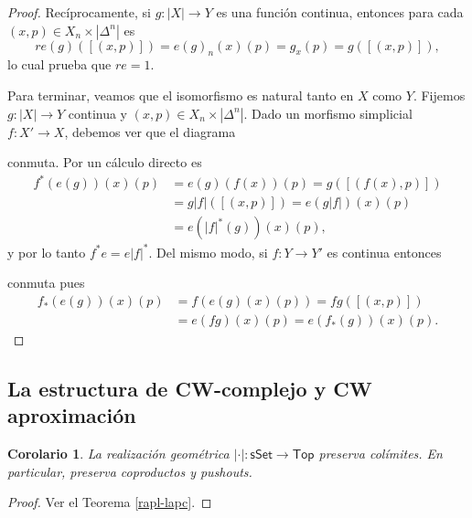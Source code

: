 \documentclass[11pt]{report}
\theoremstyle{colored}
\newtheorem{corollary}{Corolario}[section]
\newcommand{\cat}[1]{\mathsf{#1}}
\renewcommand{\ss}[1]{\Delta^{#1}}
\begin{document}
\begin{proof}
Recíprocamente, si $g : |X| \to Y$ es una función continua, entonces para cada $(x,p) \in X_n \times |\ss{n}|$ es
\[
r e(g)([(x,p)]) = e(g)_n(x)(p) = g_x(p) = g([(x,p)]),
\]
lo cual prueba que $r e  = 1$.

Para terminar, veamos que el isomorfismo es natural tanto en $X$ como $Y$. Fijemos $g : |X| \to Y$ continua y $(x,p) \in X_n \times |\ss{n}|$. Dado un morfismo simplicial $f : X' \to X$, debemos ver que el diagrama
\begin{center}
\end{center}
conmuta. Por un cálculo directo es
\begin{align*}
f^*(e(g))(x)(p) &= e(g)(f(x))(p) = g([(f(x),p)])\\
& = g|f|([(x,p)]) = e(g|f|)(x)(p)\\
& = e(|f|^*(g))(x)(p),
\end{align*}
y por lo tanto $f^*e = e|f|^*$. Del mismo modo, si $f : Y \to Y'$ es continua entonces
\begin{center}
\end{center}
conmuta pues
\begin{align*}
f_*(e(g))(x)(p) &= f(e(g)(x)(p)) = fg([(x,p)])\\
&= e(fg)(x)(p) = e(f_*(g))(x)(p).
\end{align*}
\end{proof}

\subsection{La estructura de CW-complejo y CW aproximación}

\begin{corollary} La realización geométrica $| \cdot | : \cat{sSet} \to \cat{Top}$ preserva colímites. En particular, preserva coproductos y pushouts.
\end{corollary}
\begin{proof} Ver el Teorema \ref{rapl-lapc}.
\end{proof}
\end{document}
